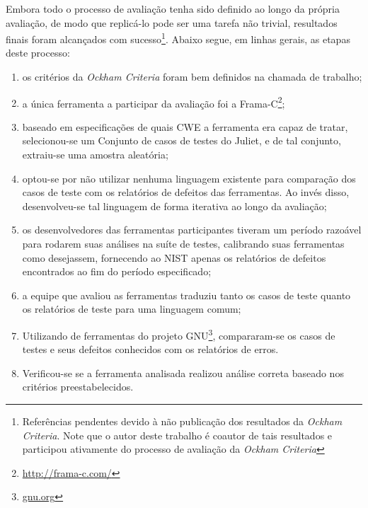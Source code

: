 Embora todo o processo de avaliação tenha sido definido ao longo da própria avaliação, de modo que replicá-lo pode ser uma tarefa não trivial, resultados finais foram alcançados com sucesso\footnote{Referências pendentes devido à não publicação dos resultados da \textit{Ockham Criteria}. Note que o autor deste trabalho é coautor de tais resultados e participou ativamente do processo de avaliação da \textit{Ockham Criteria}}. Abaixo segue, em linhas gerais, as etapas deste processo:
\begin{enumerate}
  \item os critérios da \textit{Ockham Criteria} foram bem definidos na chamada de trabalho;
    \item a única ferramenta a participar da avaliação foi a Frama-C\footnote{\url{http://frama-c.com/}};
    \item baseado em especificações de quais CWE a ferramenta era capaz de tratar, selecionou-se um Conjunto de casos de testes do Juliet, e de tal conjunto, extraiu-se uma amostra aleatória;
    \item optou-se por não utilizar nenhuma linguagem existente para comparação dos casos de teste com os relatórios de defeitos das ferramentas. Ao invés disso, desenvolveu-se tal linguagem de forma iterativa ao longo da avaliação;
    \item os desenvolvedores das ferramentas participantes tiveram um período razoável para rodarem suas análises na suíte de testes, calibrando suas ferramentas como desejassem, fornecendo ao NIST apenas os relatórios de defeitos encontrados ao fim do período especificado;
    \item a equipe que avaliou as ferramentas traduziu tanto os casos de teste quanto os relatórios de teste para uma linguagem comum;
    \item Utilizando de ferramentas do projeto GNU\footnote{\url{gnu.org}}, compararam-se os casos de testes e seus defeitos conhecidos com os relatórios de erros.
    \item Verificou-se se a ferramenta analisada realizou análise correta baseado nos critérios preestabelecidos.
\end{enumerate}

